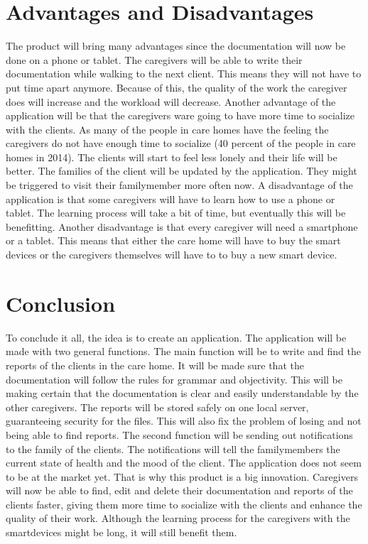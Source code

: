 \documentclass[12pt, a4paper]{article}
\begin{document}
\newpage

\section{Advantages and Disadvantages}
The product will bring many advantages since the documentation will now be done on a phone or tablet. The caregivers will be able to write their documentation while walking to the next client. This means they will not have to put time apart anymore. Because of this, the quality of the work the caregiver does will increase and the workload will decrease. Another advantage of the application will be that the caregivers ware going to have more time to socialize with the clients. As many of the people in care homes have the feeling the caregivers do not have enough time to socialize (40 percent of the people in care homes in 2014).\cite{bowman:reasoning} The clients will start to feel less lonely and their life will be better.
The families of the client will be updated by the application. They might be triggered to visit their familymember more often now.
A disadvantage of the application is that some caregivers will have to learn how to use a phone or tablet. The learning process will take a bit of time, but eventually this will be benefitting. Another disadvantage is that every caregiver will need a smartphone or a tablet. This means that either the care home will have to buy the smart devices or the caregivers themselves will have to to buy a new smart device.


\newpage

\section{Conclusion}
To conclude it all, the idea is to create an application. The application will be made with two general functions. The main function will be to write and find the reports of the clients in the care home. It will be made sure that the documentation will follow the rules for grammar and objectivity. This will be making certain that the documentation is clear and easily understandable by the other caregivers.
The reports will be stored safely on one local server, guaranteeing security for the files. This will also fix the problem of losing and not being able to find reports. 
The second function will be sending out notifications to the family of the clients. The notifications will tell the familymembers the current state of health and the mood of the client. 
The application does not seem to be at the market yet. That is why this product is a big innovation. Caregivers will now be able to find, edit and delete their documentation and reports of the clients faster, giving them more time to socialize with the clients and enhance the quality of their work. 
Although the learning process for the caregivers with the smartdevices might be long, it will still benefit them.




\end{document}
